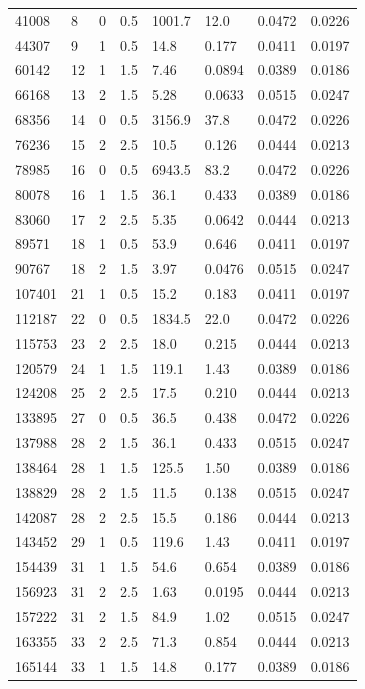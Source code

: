 \documentclass[preview]{standalone}
\begin{document}
{{\begin{tabular}{L{1.2cm}C{1.2cm} C{0.3cm}C{0.5cm} C{1.4cm}C{1.4cm} C{1.4cm}C{1.4cm}}
  41008  &     8  & 0     & 0.5 &  1001.7  & 12.0  & 0.0472 &  0.0226   \\ 
  44307  &     9  & 1     & 0.5 &  14.8  & 0.177  & 0.0411 &  0.0197   \\ 
  60142  &    12  & 1     & 1.5 &  7.46  & 0.0894  & 0.0389 &  0.0186   \\ 
  66168  &    13  & 2     & 1.5 &  5.28  & 0.0633  & 0.0515 &  0.0247   \\ 
  68356  &    14  & 0     & 0.5 &  3156.9  & 37.8  & 0.0472 &  0.0226   \\ 
  76236  &    15  & 2     & 2.5 &  10.5  & 0.126  & 0.0444 &  0.0213   \\ 
  78985  &    16  & 0     & 0.5 &  6943.5  & 83.2  & 0.0472 &  0.0226   \\ 
  80078  &    16  & 1     & 1.5 &  36.1  & 0.433  & 0.0389 &  0.0186   \\ 
  83060  &    17  & 2     & 2.5 &  5.35  & 0.0642  & 0.0444 &  0.0213   \\ 
  89571  &    18  & 1     & 0.5 &  53.9  & 0.646  & 0.0411 &  0.0197   \\ 
  90767  &    18  & 2     & 1.5 &  3.97  & 0.0476  & 0.0515 &  0.0247   \\ 
  107401  &    21  & 1     & 0.5 &  15.2  & 0.183  & 0.0411 &  0.0197   \\ 
  112187  &    22  & 0     & 0.5 &  1834.5  & 22.0  & 0.0472 &  0.0226   \\ 
  115753  &    23  & 2     & 2.5 &  18.0  & 0.215  & 0.0444 &  0.0213   \\ 
  120579  &    24  & 1     & 1.5 &  119.1  & 1.43  & 0.0389 &  0.0186   \\ 
  124208  &    25  & 2     & 2.5 &  17.5  & 0.210  & 0.0444 &  0.0213   \\ 
  133895  &    27  & 0     & 0.5 &  36.5  & 0.438  & 0.0472 &  0.0226   \\ 
  137988  &    28  & 2     & 1.5 &  36.1  & 0.433  & 0.0515 &  0.0247   \\ 
  138464  &    28  & 1     & 1.5 &  125.5  & 1.50  & 0.0389 &  0.0186   \\ 
  138829  &    28  & 2     & 1.5 &  11.5  & 0.138  & 0.0515 &  0.0247   \\ 
  142087  &    28  & 2     & 2.5 &  15.5  & 0.186  & 0.0444 &  0.0213   \\ 
  143452  &    29  & 1     & 0.5 &  119.6  & 1.43  & 0.0411 &  0.0197   \\ 
  154439  &    31  & 1     & 1.5 &  54.6  & 0.654  & 0.0389 &  0.0186   \\ 
  156923  &    31  & 2     & 2.5 &  1.63  & 0.0195  & 0.0444 &  0.0213   \\ 
  157222  &    31  & 2     & 1.5 &  84.9  & 1.02  & 0.0515 &  0.0247   \\ 
  163355  &    33  & 2     & 2.5 &  71.3  & 0.854  & 0.0444 &  0.0213   \\ 
  165144  &    33  & 1     & 1.5 &  14.8  & 0.177  & 0.0389 &  0.0186   \\ 
\hline 
\end{tabular} 

}}
\end{document}
